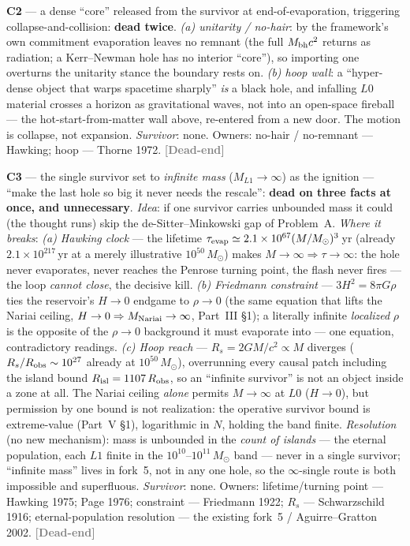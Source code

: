 \documentclass[11pt]{article}
\newcommand{\dead}{\textcolor{gray}{\textbf{[Dead-end]}}}
\newcommand{\msun}{M_\odot}
\begin{document}
\textbf{C2} --- a dense ``core'' released from the survivor at end-of-evaporation, triggering collapse-and-collision: \textbf{dead twice}. \emph{(a) unitarity / no-hair}: by the framework's own commitment evaporation leaves no remnant (the full $M_{\rm bh}c^2$ returns as radiation; a Kerr--Newman hole has no interior ``core''), so importing one overturns the unitarity stance the boundary rests on. \emph{(b) hoop wall}: a ``hyper-dense object that warps spacetime sharply'' \emph{is} a black hole, and infalling $L0$ material crosses a horizon as gravitational waves, not into an open-space fireball --- the hot-start-from-matter wall above, re-entered from a new door. The motion is collapse, not expansion. \emph{Survivor}: none. Owners: no-hair / no-remnant --- Hawking; hoop --- Thorne 1972. \dead\quad

\textbf{C3} --- the single survivor set to \emph{infinite mass} ($M_{L1}\to\infty$) as the ignition --- ``make the last hole so big it never needs the rescale'': \textbf{dead on three facts at once, and unnecessary}. \emph{Idea}: if one survivor carries unbounded mass it could (the thought runs) skip the de-Sitter--Minkowski gap of Problem~A. \emph{Where it breaks}: \emph{(a) Hawking clock} --- the lifetime $\tau_{\rm evap}\simeq2.1\times10^{67}(M/\msun)^3$\,yr (already $2.1\times10^{217}$\,yr at a merely illustrative $10^{50}\,\msun$) makes $M\to\infty\Rightarrow\tau\to\infty$: the hole never evaporates, never reaches the Penrose turning point, the flash never fires --- the loop \emph{cannot close}, the decisive kill. \emph{(b) Friedmann constraint} --- $3H^2=8\pi G\rho$ ties the reservoir's $H\to0$ endgame to $\rho\to0$ (the same equation that lifts the Nariai ceiling, $H\to0\Rightarrow M_{\rm Nariai}\to\infty$, Part~III \S1); a literally infinite \emph{localized} $\rho$ is the opposite of the $\rho\to0$ background it must evaporate into --- one equation, contradictory readings. \emph{(c) Hoop reach} --- $R_s=2GM/c^2\propto M$ diverges ($R_s/R_{\rm obs}\sim10^{27}$ already at $10^{50}\,\msun$), overrunning every causal patch including the island bound $R_{\rm isl}=1107\,R_{\rm obs}$, so an ``infinite survivor'' is not an object inside a zone at all. The Nariai ceiling \emph{alone} permits $M\to\infty$ at $L0$ ($H\to0$), but permission by one bound is not realization: the operative survivor bound is extreme-value (Part~V \S1), logarithmic in $N$, holding the band finite. \emph{Resolution} (no new mechanism): mass is unbounded in the \emph{count of islands} --- the eternal population, each $L1$ finite in the $10^{10}$--$10^{11}\,\msun$ band --- never in a single survivor; ``infinite mass'' lives in fork~5, not in any one hole, so the $\infty$-single route is both impossible and superfluous. \emph{Survivor}: none. Owners: lifetime/turning point --- Hawking 1975; Page 1976; constraint --- Friedmann 1922; $R_s$ --- Schwarzschild 1916; eternal-population resolution --- the existing fork~5 / Aguirre--Gratton 2002. \dead\quad
\end{document}
